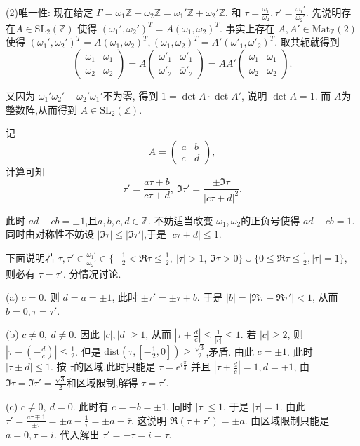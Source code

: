 \begin{itemize}
    (2)唯一性: 现在给定 $\Gamma = \omega_1 \mathbb{Z}+\omega_2 \mathbb{Z}
    = \omega_1' \mathbb{Z}+\omega_2' \mathbb{Z}$, 
    和 $\tau = \frac{\omega_1}{\omega_2} ,\tau' = \frac{\omega_1'}{\omega_2'}$. 
    先说明存在$A \in \text{SL}_2(\mathbb{Z})$ 
    使得 $(\omega_1', \omega_2')^{T} = A(\omega_1,\omega_2)^{T}$. 
    事实上存在 $A,A' \in \text{Mat}_{\mathbb{Z}}(2)$
    使得 $(\omega_1', \omega_2')^{T} 
    = A(\omega_1,\omega_2)^{T}, (\omega_1, \omega_2)^{T} 
    = A'(\omega'_1,\omega'_2)^{T}$. 取共轭就得到
   $$ \begin{pmatrix}
        \omega_1 & \overline{\omega}_1\\
        \omega_2 & \overline{\omega}_2
   \end{pmatrix} = A \begin{pmatrix}
    \omega'_1 & \overline{\omega}'_1\\
    \omega'_2 & \overline{\omega}'_2
\end{pmatrix} = AA'\begin{pmatrix}
    \omega_1 & \overline{\omega}_1\\
    \omega_2 & \overline{\omega}_2
\end{pmatrix}.$$

又因为  $\omega_1' \overline{\omega}_2' 
- \omega_2' \overline{\omega}_1'$不为零, 得到 $1 = \det A \cdot \det A'$,  
说明 $\det A = 1.$ 而 $A$为整数阵,从而得到 $A \in \text{SL}_2(\mathbb{Z})$.

记 
$$A = \begin{pmatrix}
   a& b\\
   c& d
\end{pmatrix},$$
计算可知 
$$\tau' = \frac{a \tau +b}{c\tau+d},
\ \Im\tau' = \frac{\pm \Im\tau}{|c\tau+d|^2}.$$

此时 $ad-cb=\pm1$,且$a,b,c,d \in \mathbb{Z}$. 
不妨适当改变 $\omega_1,\omega_2$的正负号使得 $ad-cb = 1$. 
同时由对称性不妨设 $|\Im\tau|\le |\Im\tau'|$,于是 $|c\tau+d|\le 1$.

下面说明若  $\tau,\tau' \in \frac{\omega_1'}{\omega_2'} 
\in \{-\frac{1}{2}<\Re\tau\le \frac{1}{2},\ |\tau|> 1,
\ \Im\tau>0\}\cup \{0\le \Re\tau\le \frac{1}{2}, |\tau|=1\}$,
则必有 $\tau=\tau'$. 分情况讨论.

(a) $c=0$. 则 $d= a=\pm 1$, 此时 $\pm \tau' = \pm \tau+b $. 
于是 $|b| = |\Re\tau-\Re\tau'|<1$, 从而 $b=0, \tau = \tau'$.

(b) $c \ne 0,\ d \ne 0.$ 因此 $|c|,|d|\ge 1$, 
从而 $|\tau + \frac{d}{c}|\le \frac{1}{|c|}\le 1 $. 
若 $|c|\ge 2$, 则 $|\tau-(-\frac{d}{c})|\le \frac{1}{2}$. 
但是 $\text{dist}(\tau,[-\frac{1}{2},0])\ge \frac{\sqrt{3}}{2}$,矛盾. 
由此 $c=\pm 1$. 此时 $|\tau\pm d|\le 1$. 
按 $\tau$的区域,此时只能是 $\tau = e^{i\frac{\pi}{3}}$
并且 $|\tau+ \frac{d}{c}| = 1, d = \mp 1$, 
由 $\Im\tau = \Im\tau' = \frac{\sqrt{3}}{2}$和区域限制,解得 $\tau = \tau'$.

(c)  $c \ne 0,\ d= 0.$ 此时有 $c=-b=\pm 1$, 同时 $|\tau|\le 1$, 于是 $|\tau|=1$. 
由此 $\tau' =\frac{a\tau\mp1}{\pm\tau}= \pm a- \frac{1}{\tau }=\pm a -\overline{\tau}$. 
这说明 $\Re(\tau+\tau') = \pm a$. 由区域限制只能是 $a=0, \tau = i$. 
代入解出 $\tau' = -\overline{\tau} = i=\tau$. 

\end{itemize}

